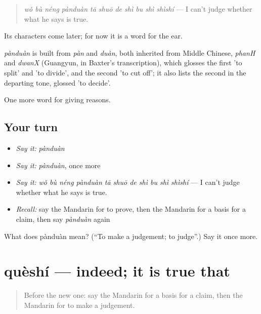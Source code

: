 \begin{quote}
\emph{wǒ bù néng pànduàn tā shuō de shì bu shì shìshí} — I can't judge whether what he says is true.
\end{quote}

Its characters come later; for now it is a word for the ear.

\begin{cousinweb}
\emph{pànduàn} is built from \emph{pàn} and \emph{duàn}, both inherited from Middle Chinese, \emph{phanH} and \emph{dwanX} (Guangyun, in Baxter's transcription), which glosses the first 'to split' and 'to divide', and the second 'to cut off'; it also lists the second in the departing tone, glossed 'to decide'.
\end{cousinweb}

\begin{grammarlens}[title={What you've built}]
One more word for giving reasons.
\end{grammarlens}

\subsection*{Your turn}
\begin{itemize}
\raggedright
  \item \emph{Say it:} \emph{pànduàn}
  \item \emph{Say it:} \emph{pànduàn}, once more
  \item \emph{Say it:} \emph{wǒ bù néng pànduàn tā shuō de shì bu shì shìshí} — I can't judge whether what he says is true.
  \item \emph{Recall:} say the Mandarin for to prove, then the Mandarin for a basis for a claim, then say \emph{pànduàn} again
\end{itemize}

\begin{tcolorbox}[breakable,colback=teal!4,colframe=teal!35!black,title={Before you move on}]
What does pànduàn mean? (\textquotedblleft{}To make a judgement; to judge\textquotedblright{}.) Say it once more.
\end{tcolorbox}
\section[quèshí]{quèshí — indeed; it is true that}

\label{lesson:ZH-C350-queshi}



\begin{quote}
Before the new one: say the Mandarin for a basis for a claim, then the Mandarin for to make a judgement.
\end{quote}

